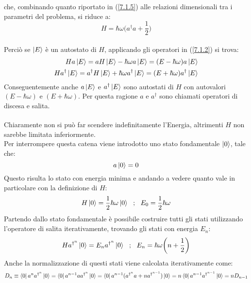 \documentclass[twoside]{article}
\begin{document}
che, combinando quanto riportato in (\ref{7.1.5}) alle relazioni dimensionali tra i parametri del problema, si riduce a:
\begin{equation}
    H=\hbar \omega \biggl( a^{\dagger}a+\frac{1}{2}  \biggr)
\end{equation}
\\
Perciò se $\ket{E}$ è un autostato di $H$, applicando gli operatori in (\ref{7.1.2}) si trova:
\begin{equation}
    \begin{split}
         Ha\ket{E}=aH\ket{E}-\hbar \omega a \ket{E}=(E-\hbar \omega)a\ket{E} \\
        Ha^{\dagger}\ket{E}=a^{\dagger}H\ket{E}+\hbar \omega a^{\dagger}\ket{E}=(E+\hbar \omega )a^{\dagger}\ket{E}
        \end{split}
\end{equation}
Conseguentemente anche $a\ket{E}$ e $a^{\dagger}\ket{E}$ sono autostati di $H$ con autovalori $(E-\hbar \omega)$ e $(E+\hbar \omega)$. Per questa ragione $a$ e $a^{\dagger}$ sono chiamati operatori di discesa e salita.
\\ \\
Chiaramente non si può far scendere indefinitamente l'Energia, altrimenti $H$ non sarebbe limitata inferiormente.
\\
Per interrompere questa catena viene introdotto uno stato fondamentale $\ket{0}$, tale che:
\begin{equation}
    a\ket{0}=0
\end{equation}
Questo risulta lo stato con energia minima e andando a vedere quanto vale in particolare con la definizione di $H$:
\begin{equation}
    H\ket{0}=\frac{1}{2}\hbar \omega \ket{0} \ \ ; \ \ E_0 = \frac{1}{2}\hbar \omega
\end{equation}
Partendo dallo stato fondamentale è possibile costruire tutti gli stati utilizzando l'operatore di salita iterativamente, trovando gli stati con energia $E_n$:
\begin{equation}
    Ha^{\dagger^n}\ket{0}=E_n a^{\dagger^n}\ket{0} \ \ ; \ \ E_n=\hbar \omega \biggl( n+\frac{1}{2} \biggr)
\end{equation}
Anche la normalizzazione di questi stati viene calcolata iterativamente come:
\begin{equation}
    D_n\equiv \bra{0}a^na^{\dagger^n}\ket{0}=\bra{0}a^{n-1}aa^{\dagger^n}\ket{0}=\bra{0}a^{n-1}(a^{\dagger^n}a+na^{\dagger^{n-1}})\ket{0}=n\bra{0}a^{n-1}a^{\dagger^{n-1}}\ket{0}=nD_{n-1}
\end{equation}
\end{document}
